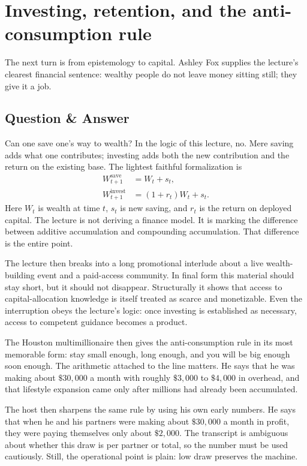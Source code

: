 \section{Investing, retention, and the anti-consumption rule}

The next turn is from epistemology to capital. Ashley Fox supplies the lecture's clearest financial sentence: wealthy people do not leave money sitting still; they give it a job.

\subsection{Question \& Answer}

Can one save one's way to wealth? In the logic of this lecture, no. Mere saving adds what one contributes; investing adds both the new contribution and the return on the existing base. The lightest faithful formalization is
\begin{align}
W_{t+1}^{\mathrm{save}} &= W_t + s_t, \\
W_{t+1}^{\mathrm{invest}} &= (1+r_t)W_t + s_t.
\end{align}
Here \(W_t\) is wealth at time \(t\), \(s_t\) is new saving, and \(r_t\) is the return on deployed capital. The lecture is not deriving a finance model. It is marking the difference between additive accumulation and compounding accumulation. That difference is the entire point.

The lecture then breaks into a long promotional interlude about a live wealth-building event and a paid-access community. In final form this material should stay short, but it should not disappear. Structurally it shows that access to capital-allocation knowledge is itself treated as scarce and monetizable. Even the interruption obeys the lecture's logic: once investing is established as necessary, access to competent guidance becomes a product.

The Houston multimillionaire then gives the anti-consumption rule in its most memorable form: stay small enough, long enough, and you will be big enough soon enough. The arithmetic attached to the line matters. He says that he was making about \(\$30{,}000\) a month with roughly \(\$3{,}000\) to \(\$4{,}000\) in overhead, and that lifestyle expansion came only after millions had already been accumulated.

The host then sharpens the same rule by using his own early numbers. He says that when he and his partners were making about \(\$30{,}000\) a month in profit, they were paying themselves only about \(\$2{,}000\). The transcript is ambiguous about whether this draw is per partner or total, so the number must be used cautiously. Still, the operational point is plain: low draw preserves the machine.

